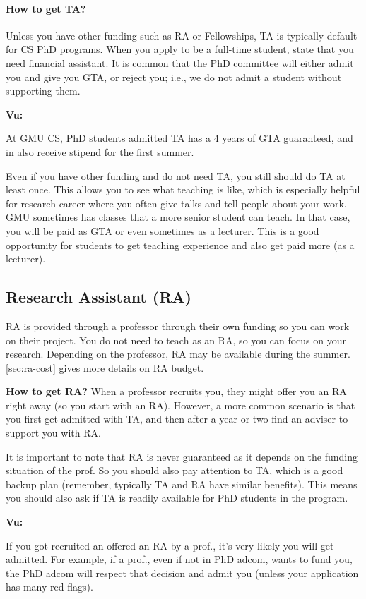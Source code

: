\documentclass[oneside,11pt,dvipsnames]{book}
\newenvironment{commentbox}[1][]{
  \small
  \begin{mybox}
    {\small \textbf{#1}}
  }{
  \end{mybox}
}
\begin{document}
\paragraph{How to get TA?}  Unless you have other funding such as RA or Fellowships, TA is typically default for CS PhD programs. When you apply to be a full-time student,  state that you need financial assistant. It is common that the PhD committee will either admit you and give you GTA, or reject you; i.e., we do not admit a student without supporting them.

\begin{commentbox}[Vu:]
  At GMU CS, PhD students admitted TA has a 4 years of GTA guaranteed, and in also receive  stipend for the first summer.
\end{commentbox}

Even if you have other funding and do not need TA, you still should do TA at least once.  This allows you to see what teaching is like, which is especially helpful for research career where you often give talks and tell people about your work. GMU sometimes has classes that a more senior student can teach.  In that case, you will be paid as GTA or even sometimes as a lecturer.  This is a good opportunity for students to get teaching experience and also get paid more (as a lecturer).

\subsection{Research Assistant (RA)}\label{sec:ra}
RA is provided through a professor through their own funding so you can work on their project.
You do not need to teach as an RA, so you can focus on your research. Depending on the professor, RA may be available during the summer. \autoref{sec:ra-cost} gives more details on RA budget.

\textbf{How to get RA?} When a professor recruits you, they might offer you an RA right away (so you start with an RA).  However, a more common scenario is that you first get admitted with TA, and then after a year or two find an adviser to support you with RA.

It is important to note that RA is never guaranteed as it depends on the funding situation of the prof. So you should also pay attention to TA, which is a good backup plan (remember, typically TA and RA have similar benefits). This means you should also ask if TA is readily available for PhD students in the program.


\begin{commentbox}[Vu:]
  If you got recruited an offered an RA by a prof., it's very likely you will get admitted.  For example, if a prof., even if not in PhD adcom, wants to fund you, the PhD adcom will respect that decision and admit you (unless your application has many red flags).
\end{commentbox}
\end{document}
